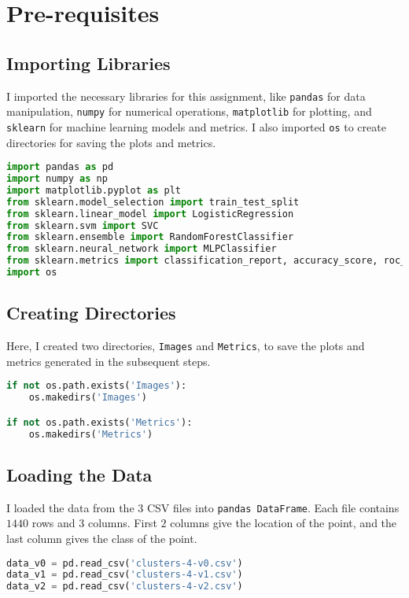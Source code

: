 \section*{Pre-requisites}

\subsection*{Importing Libraries}

I imported the necessary libraries for this assignment, like \texttt{pandas} for data manipulation, \texttt{numpy} for numerical operations, \texttt{matplotlib} for plotting, and \texttt{sklearn} for machine learning models and metrics. I also imported \texttt{os} to create directories for saving the plots and metrics.

\begin{lstlisting}[language=Python, caption=Importing Libraries]
import pandas as pd
import numpy as np
import matplotlib.pyplot as plt
from sklearn.model_selection import train_test_split
from sklearn.linear_model import LogisticRegression
from sklearn.svm import SVC
from sklearn.ensemble import RandomForestClassifier
from sklearn.neural_network import MLPClassifier
from sklearn.metrics import classification_report, accuracy_score, roc_auc_score, roc_curve
import os
\end{lstlisting}

\subsection*{Creating Directories}

Here, I created two directories, \texttt{Images} and \texttt{Metrics}, to save the plots and metrics generated in the subsequent steps.

\begin{lstlisting}[language=Python, caption=Creating Directories]
if not os.path.exists('Images'):
    os.makedirs('Images')

if not os.path.exists('Metrics'):
    os.makedirs('Metrics')
\end{lstlisting}

\subsection*{Loading the Data}

I loaded the data from the $3$ CSV files into \texttt{pandas DataFrame}. Each file contains $1440$ rows and $3$ columns. First $2$ columns give the location of the point, and the last column gives the class of the point.

\begin{lstlisting}[language=Python, caption=Loading the Data]
data_v0 = pd.read_csv('clusters-4-v0.csv')
data_v1 = pd.read_csv('clusters-4-v1.csv')
data_v2 = pd.read_csv('clusters-4-v2.csv')
\end{lstlisting}



